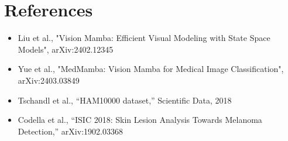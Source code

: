 \documentclass[11pt]{article}
\begin{document}
\section*{References}
\begin{itemize}
    \item Liu et al., "Vision Mamba: Efficient Visual Modeling with State Space Models", arXiv:2402.12345
    \item Yue et al., "MedMamba: Vision Mamba for Medical Image Classification", arXiv:2403.03849
    \item Tschandl et al., “HAM10000 dataset,” Scientific Data, 2018
    \item Codella et al., “ISIC 2018: Skin Lesion Analysis Towards Melanoma Detection,” arXiv:1902.03368
\end{itemize}
\end{document}
